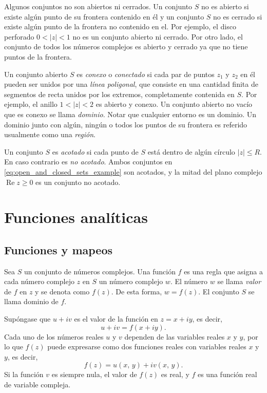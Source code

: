 \documentclass[a4paper]{report}
\renewcommand{\Re}{\operatorname{Re}}
\begin{document}
Algunos conjuntos no son abiertos ni cerrados. Un conjunto \(S\) no es abierto si existe algún punto de su frontera contenido en él y un conjunto \(S\) no es cerrado si existe algún punto de la frontera no contenido en el. Por ejemplo, el disco perforado \(0<|z|<1\) no es un conjunto abierto ni cerrado. Por otro lado, el conjunto de todos los números complejos es abierto y cerrado ya que no tiene puntos de la frontera.  

Un conjunto abierto \(S\) es \emph{conexo} o \emph{conectado} si cada par de puntos \(z_1\) y \(z_2\) en él pueden ser unidos por una \emph{línea poligonal}, que consiste en una cantidad finita de segmentos de recta unidos por los extremos, completamente contenida en \(S\). Por ejemplo, el anillo \(1<|z|<2\) es abierto y conexo. Un conjunto abierto no vacío que es conexo se llama \emph{dominio}. Notar que cualquier entorno es un dominio. Un dominio junto con algún, ningún o todos los puntos de su frontera es referido usualmente como una \emph{región}.

Un conjunto \(S\) es \emph{acotado} si cada punto de \(S\) está dentro de algún círculo \(|z|\leq R\). En caso contrario es \emph{no acotado}. Ambos conjuntos en \ref{eq:open_and_closed_sets_example} son acotados, y la mitad del plano complejo \(\Re z\geq0\) es un conjunto no acotado.

\chapter{Funciones analíticas}

\section{Funciones y mapeos}

Sea \(S\) un conjunto de números complejos. Una función \(f\) es una regla que asigna a cada número complejo \(z\) en \(S\) un número complejo \(w\). El número \(w\) se llama \emph{valor} de \(f\) en \(z\) y se denota como \(f(z)\). De esta forma, \(w=f(z)\). El conjunto \(S\) se llama dominio de \(f\).

Supóngase que \(u+iv\) es el valor de la función en \(z=x+iy\), es decir,
\[
 u+iv=f(x+iy).
\]
Cada uno de los números reales \(u\) y \(v\) dependen de las variables reales \(x\) y \(y\), por lo que \(f(z)\) puede expresarse como dos funciones reales con variables reales \(x\) y \(y\), es decir,
\[
 f(z)=u(x,\,y)+iv(x,\,y).
\]
Si la función \(v\) es siempre nula, el valor de \(f(z)\) es real, y \(f\) es una función real de variable compleja.
\end{document}
